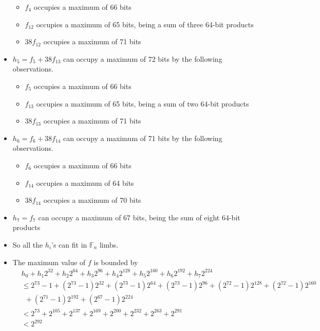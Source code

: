 \documentclass[a4paper, 12pt]{article}
\begin{document}
\begin{itemize}
\begin{itemize}
      \item $f_4$ occupies a maximum of 66 bits
      \item $f_{12}$ occupies a maximum of 65 bits, being a sum of three 64-bit products
      \item $38f_{12}$ occupies a maximum of 71 bits
    \end{itemize}
  \item $h_5 = f_5 + 38 f_{13}$ can occupy a maximum of 72 bits by the following observations.
    \begin{itemize}
      \item $f_5$ occupies a maximum of 66 bits
      \item $f_{13}$ occupies a maximum of 65 bits, being a sum of two 64-bit products
      \item $38f_{13}$ occupies a maximum of 71 bits
    \end{itemize}
  \item $h_6 = f_6 + 38 f_{14}$ can occupy a maximum of 71 bits by the following observations.
    \begin{itemize}
      \item $f_6$ occupies a maximum of 66 bits
      \item $f_{14}$ occupies a maximum of 64 bits
      \item $38f_{14}$ occupies a maximum of 70 bits
    \end{itemize}
  \item $h_7 = f_7$ can occupy a maximum of 67 bits, being the sum of eight 64-bit products
  \item So all the $h_i$'s can fit in $\mathbb{F}_n$ limbs.
  \item The maximum value of $f$ is bounded by
    \begin{align*}
   &  h_0 + h_1 2^{32} + h_2 2^{64} + h_3 2^{96} + h_4 2^{128} +   h_5 2^{160} + h_6 2^{192}+ h_7 2^{224} \\
   & \le 2^{73}-1 + \left( 2^{73}-1 \right) 2^{32} + \left( 2^{73}-1 \right) 2^{64} + \left( 2^{73}-1 \right) 2^{96} + \left( 2^{72}-1 \right)2^{128} +  \left( 2^{72}-1 \right) 2^{160} \\
   & \ \ + \left( 2^{71}-1 \right) 2^{192}+ \left( 2^{67}-1 \right) 2^{224}\\
   & < 2^{73} + 2^{105} + 2^{137} + 2^{169} + 2^{200} + 2^{232} + 2^{263} + 2^{291}\\
   & < 2^{292}
    \end{align*}
\end{itemize}
\end{document}
